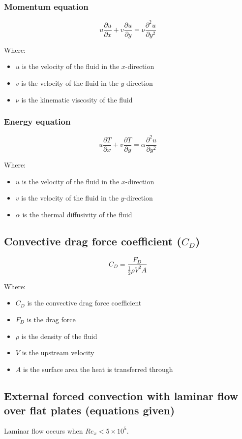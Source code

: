 \documentclass[11pt]{article}
\begin{document}
\subsubsection{Momentum equation}
\label{sec:orga8f4e62}
\[u \frac{\partial u}{\partial x} + v \frac{\partial u}{\partial y} = \nu \frac{\partial^2 u}{\partial y^2}\]

Where:
\begin{itemize}
\item \(u\) is the velocity of the fluid in the \(x\)-direction
\item \(v\) is the velocity of the fluid in the \(y\)-direction
\item \(\nu\) is the kinematic viscosity of the fluid
\end{itemize}
\subsubsection{Energy equation}
\label{sec:orga3b034f}
\[u \frac{\partial T}{\partial x} + v \frac{\partial T}{\partial y} = \alpha \frac{\partial^2 u}{\partial y^2}\]

Where:
\begin{itemize}
\item \(u\) is the velocity of the fluid in the \(x\)-direction
\item \(v\) is the velocity of the fluid in the \(y\)-direction
\item \(\alpha\) is the thermal diffusivity of the fluid
\end{itemize}
\subsection{Convective drag force coefficient (\(C_D\))}
\label{sec:org33f77b6}
\[C_D = \frac{F_D}{\frac{1}{2} \rho V^2 A}\]

Where:
\begin{itemize}
\item \(C_D\) is the convective drag force coefficient
\item \(F_D\) is the drag force
\item \(\rho\) is the density of the fluid
\item \(V\) is the upstream velocity
\item \(A\) is the surface area the heat is transferred through
\end{itemize}
\subsection{External forced convection with laminar flow over flat plates (equations given)}
\label{sec:orgc6ef93e}
Laminar flow occurs when \(Re_x < 5 \times 10^5\).
\end{document}
